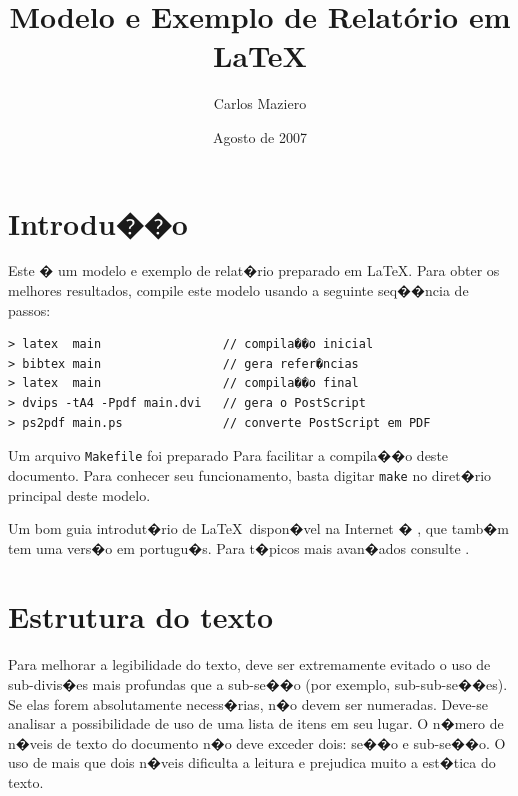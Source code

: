\documentclass [12pt,oneside] {article}
\begin{document}
\title {Modelo e Exemplo de Relatório em \LaTeX}
\author {Carlos Maziero}
\date {Agosto de 2007}
\maketitle


\section{Introdu��o}

Este � um modelo e exemplo de relat�rio preparado em \LaTeX. Para obter os melhores resultados, compile este modelo usando a seguinte seq��ncia de passos:

\begin{footnotesize}
\begin{verbatim}
> latex  main                 // compila��o inicial
> bibtex main                 // gera refer�ncias
> latex  main                 // compila��o final
> dvips -tA4 -Ppdf main.dvi   // gera o PostScript
> ps2pdf main.ps              // converte PostScript em PDF
\end{verbatim}
\end{footnotesize}

Um arquivo \texttt{Makefile} foi preparado Para facilitar a compila��o deste documento. Para conhecer seu funcionamento, basta digitar \texttt{make} no diret�rio principal deste modelo.

Um bom guia introdut�rio de \LaTeX\ dispon�vel na Internet � \cite{oetiker07}, que tamb�m tem uma vers�o em portugu�s. Para t�picos mais avan�ados consulte \cite{goossens93}.


\section{Estrutura do texto}

Para melhorar a legibilidade do texto, deve ser extremamente evitado o uso de sub-divis�es mais profundas que a sub-se��o (por exemplo, sub-sub-se��es). Se elas forem absolutamente necess�rias, n�o devem ser numeradas. Deve-se analisar a possibilidade de uso de uma lista de itens em seu lugar. O n�mero de n�veis de texto do documento n�o deve exceder dois: se��o e sub-se��o. O uso de mais que dois n�veis dificulta a leitura e prejudica muito a est�tica do texto.
\end{document}
